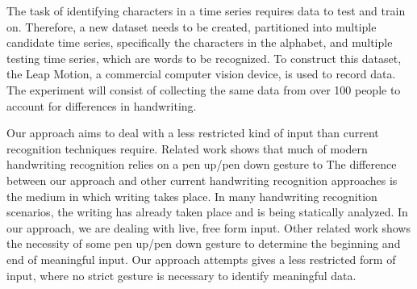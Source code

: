 The task of identifying characters in a time series requires data to test and
train on. Therefore, a new dataset needs to be created, partitioned into
 multiple candidate time series, specifically the characters in the alphabet,
  and multiple testing time series, which are words to be recognized. 
To construct this dataset, the Leap Motion, a commercial computer vision device,
is used to record data. The experiment will consist of collecting the same data
from over 100 people to account for differences in handwriting.

Our approach aims to deal with a less restricted kind of input than current
recognition techniques require. Related work shows that much of modern
handwriting recognition relies on a pen up/pen down gesture to 
The difference between our approach and other current handwriting recognition
approaches is the medium in which writing takes place. In many handwriting
recognition scenarios, the writing has already taken place and is being
statically analyzed. 
In our approach, we are dealing with live, free form input. 
Other related work shows the necessity of some pen up/pen down gesture 
to determine the beginning and end of meaningful input. 
Our approach attempts gives a less restricted form of input, 
where no strict gesture is necessary to identify meaningful data.

